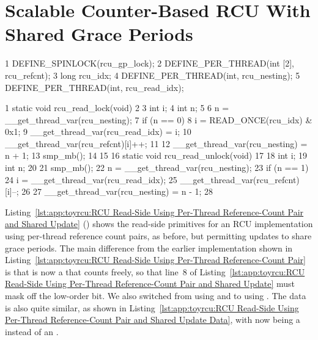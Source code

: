 \section{Scalable Counter-Based RCU With Shared Grace Periods}
\label{sec:app:toyrcu:Scalable Counter-Based RCU With Shared Grace Periods}

\begin{listing}[tbp]
{ \scriptsize
\begin{verbbox}
  1 DEFINE_SPINLOCK(rcu_gp_lock);
  2 DEFINE_PER_THREAD(int [2], rcu_refcnt);
  3 long rcu_idx;
  4 DEFINE_PER_THREAD(int, rcu_nesting);
  5 DEFINE_PER_THREAD(int, rcu_read_idx);
\end{verbbox}
}
\centering
\theverbbox
\caption{RCU Read-Side Using Per-Thread Reference-Count Pair and Shared Update Data}
\label{lst:app:toyrcu:RCU Read-Side Using Per-Thread Reference-Count Pair and Shared Update Data}
\end{listing}

\begin{listing}[tbp]
{ \scriptsize
\begin{verbbox}
  1 static void rcu_read_lock(void)
  2 {
  3   int i;
  4   int n;
  5
  6   n = __get_thread_var(rcu_nesting);
  7   if (n == 0) {
  8     i = READ_ONCE(rcu_idx) & 0x1;
  9     __get_thread_var(rcu_read_idx) = i;
 10     __get_thread_var(rcu_refcnt)[i]++;
 11   }
 12   __get_thread_var(rcu_nesting) = n + 1;
 13   smp_mb();
 14 }
 15
 16 static void rcu_read_unlock(void)
 17 {
 18   int i;
 19   int n;
 20
 21   smp_mb();
 22   n = __get_thread_var(rcu_nesting);
 23   if (n == 1) {
 24      i = __get_thread_var(rcu_read_idx);
 25      __get_thread_var(rcu_refcnt)[i]--;
 26   }
 27   __get_thread_var(rcu_nesting) = n - 1;
 28 }
\end{verbbox}
}
\centering
\theverbbox
\caption{RCU Read-Side Using Per-Thread Reference-Count Pair and Shared Update}
\label{lst:app:toyrcu:RCU Read-Side Using Per-Thread Reference-Count Pair and Shared Update}
\end{listing}

Listing~\ref{lst:app:toyrcu:RCU Read-Side Using Per-Thread Reference-Count Pair and Shared Update}
()
shows the read-side primitives for an RCU implementation using per-thread
reference count pairs, as before, but permitting updates to share
grace periods.
The main difference from the earlier implementation shown in
Listing~\ref{lst:app:toyrcu:RCU Read-Side Using Per-Thread Reference-Count Pair}
is that  is now a  that counts freely,
so that line~8 of
Listing~\ref{lst:app:toyrcu:RCU Read-Side Using Per-Thread Reference-Count Pair and Shared Update}
must mask off the low-order bit.
We also switched from using  and 
to using .
The data is also quite similar, as shown in
Listing~\ref{lst:app:toyrcu:RCU Read-Side Using Per-Thread Reference-Count Pair and Shared Update Data},
with  now being a  instead of an
.

